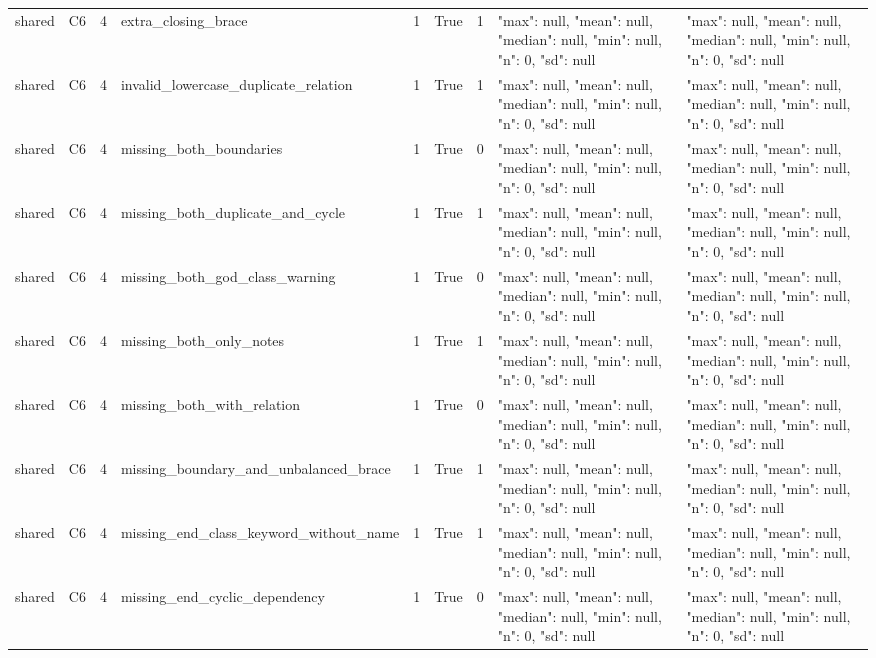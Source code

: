 \begin{tabular}{lllllllll}
shared & C6 & 4 & extra\_closing\_brace & 1 & True & 1 & {"max": null, "mean": null, "median": null, "min": null, "n": 0, "sd": null} & {"max": null, "mean": null, "median": null, "min": null, "n": 0, "sd": null} \\
shared & C6 & 4 & invalid\_lowercase\_duplicate\_relation & 1 & True & 1 & {"max": null, "mean": null, "median": null, "min": null, "n": 0, "sd": null} & {"max": null, "mean": null, "median": null, "min": null, "n": 0, "sd": null} \\
shared & C6 & 4 & missing\_both\_boundaries & 1 & True & 0 & {"max": null, "mean": null, "median": null, "min": null, "n": 0, "sd": null} & {"max": null, "mean": null, "median": null, "min": null, "n": 0, "sd": null} \\
shared & C6 & 4 & missing\_both\_duplicate\_and\_cycle & 1 & True & 1 & {"max": null, "mean": null, "median": null, "min": null, "n": 0, "sd": null} & {"max": null, "mean": null, "median": null, "min": null, "n": 0, "sd": null} \\
shared & C6 & 4 & missing\_both\_god\_class\_warning & 1 & True & 0 & {"max": null, "mean": null, "median": null, "min": null, "n": 0, "sd": null} & {"max": null, "mean": null, "median": null, "min": null, "n": 0, "sd": null} \\
shared & C6 & 4 & missing\_both\_only\_notes & 1 & True & 1 & {"max": null, "mean": null, "median": null, "min": null, "n": 0, "sd": null} & {"max": null, "mean": null, "median": null, "min": null, "n": 0, "sd": null} \\
shared & C6 & 4 & missing\_both\_with\_relation & 1 & True & 0 & {"max": null, "mean": null, "median": null, "min": null, "n": 0, "sd": null} & {"max": null, "mean": null, "median": null, "min": null, "n": 0, "sd": null} \\
shared & C6 & 4 & missing\_boundary\_and\_unbalanced\_brace & 1 & True & 1 & {"max": null, "mean": null, "median": null, "min": null, "n": 0, "sd": null} & {"max": null, "mean": null, "median": null, "min": null, "n": 0, "sd": null} \\
shared & C6 & 4 & missing\_end\_class\_keyword\_without\_name & 1 & True & 1 & {"max": null, "mean": null, "median": null, "min": null, "n": 0, "sd": null} & {"max": null, "mean": null, "median": null, "min": null, "n": 0, "sd": null} \\
shared & C6 & 4 & missing\_end\_cyclic\_dependency & 1 & True & 0 & {"max": null, "mean": null, "median": null, "min": null, "n": 0, "sd": null} & {"max": null, "mean": null, "median": null, "min": null, "n": 0, "sd": null} \\

\end{tabular}

